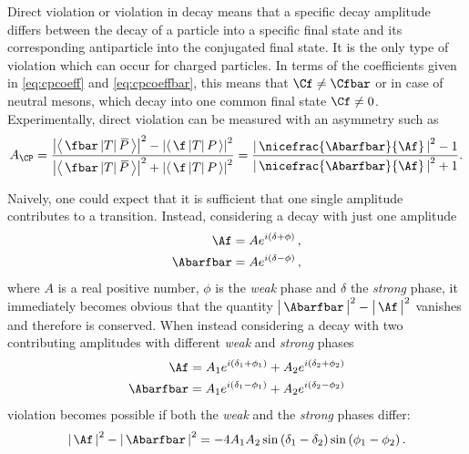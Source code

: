 Direct \CP violation or \CP violation in decay means that a specific decay amplitude differs between the decay of a particle into a specific final state and its corresponding antiparticle into the conjugated final state.
It is the only type of \CP violation which can occur for charged particles.
In terms of the \CP coefficients given in \cref{eq:cpcoeff} and \cref{eq:cpcoeffbar}, this means that $\Cf\neq\Cfbar$ or in case of neutral mesons, which decay into one common final state $\Cf\neq0$.
Experimentally, direct \CP violation can be measured with an asymmetry such as
\begin{equation}
A_{\CP}=\frac{\left|\left<\,\fbar\,|T|\,\kern 0.18em\overline{\kern -0.18em P}\,\right>\right|^2-\left|\left<\,\f\,|T|\,P\,\right>\right|^2}{\left|\left<\,\fbar\,|T|\,\kern 0.18em\overline{\kern -0.18em P}\,\right>\right|^2+\left|\left<\,\f\,|T|\,P\,\right>\right|^2} = \frac{\left|\,\nicefrac{\Abarfbar}{\Af}\,\right|^2-1}{\left|\,\nicefrac{\Abarfbar}{\Af}\,\right|^2+1}.
\end{equation}

Naively, one could expect that it is sufficient that one single amplitude contributes to a transition.
Instead, considering a decay with just one amplitude
\begin{equation}
\begin{split}
\Af&=Ae^{i\left(\delta+\phi\right)}\,,\\
\Abarfbar&=Ae^{i\left(\delta-\phi\right)}\,,
\end{split}
\end{equation}
where $A$ is a real positive number, $\phi$ is the \emph{weak} phase and $\delta$ the \emph{strong} phase, it immediately becomes obvious that the quantity $\big|\,\Abarfbar\,\big|^2-\big|\,\Af\,\big|^2$ vanishes and therefore \CP is conserved.
When instead considering a decay with two contributing amplitudes with different \emph{weak} and \emph{strong} phases
\begin{equation}
\begin{split}
\Af=A_1e^{i\left(\delta_1+\phi_1\right)}+A_2e^{i\left(\delta_2+\phi_2\right)}\\
\Abarfbar=A_1e^{i\left(\delta_1-\phi_1\right)}+A_2e^{i\left(\delta_2-\phi_2\right)}
\end{split}
\end{equation}
\CP violation becomes possible if both the \emph{weak} and the \emph{strong} phases differ:
\begin{equation}
\left|\,\Af\,\right|^2-\left|\,\Abarfbar\,\right|^2=-4A_1A_2\sin\left(\delta_1-\delta_2\right)\sin\left(\phi_1-\phi_2\right).
\end{equation}

